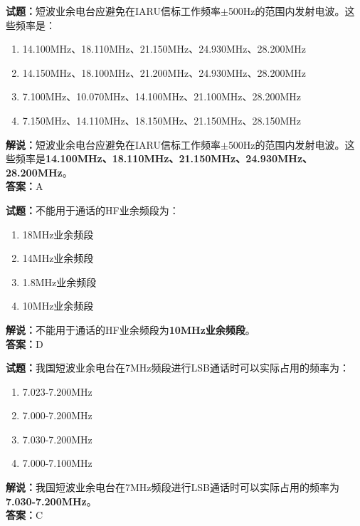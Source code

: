 \documentclass{ctexbook}
\begin{document}
\noindent\textbf{试题：}短波业余电台应避免在IARU信标工作频率$\pm$500Hz的范围内发射电波。这些频率是：%
\begin{enumerate}[leftmargin=3em]
  \item 14.100\unit{\MHz}、18.110\unit{\MHz}、21.150\unit{\MHz}、24.930\unit{\MHz}、28.200\unit{\MHz}
  \item 14.150\unit{\MHz}、18.100\unit{\MHz}、21.200\unit{\MHz}、24.930\unit{\MHz}、28.200\unit{\MHz}
  \item 7.100\unit{\MHz}、10.070\unit{\MHz}、14.100\unit{\MHz}、21.100\unit{\MHz}、28.200\unit{\MHz}
  \item 7.150\unit{\MHz}、14.110\unit{\MHz}、18.150\unit{\MHz}、21.150\unit{\MHz}、28.150\unit{\MHz}
\end{enumerate}
\noindent\textbf{解说：}短波业余电台应避免在IARU信标工作频率$\pm$500Hz的范围内发射电波。这些频率是\textbf{14.100\unit{\MHz}、18.110\unit{\MHz}、21.150\unit{\MHz}、24.930\unit{\MHz}、28.200\unit{\MHz}}。\\\noindent\textbf{答案：}A%

\bigskip

\noindent\textbf{试题：}不能用于通话的HF业余频段为：
\begin{enumerate}[leftmargin=3em]
  \item 18\unit{\MHz}业余频段
  \item 14\unit{\MHz}业余频段
  \item 1.8\unit{\MHz}业余频段
  \item 10\unit{\MHz}业余频段
\end{enumerate}
\noindent\textbf{解说：}不能用于通话的HF业余频段为\textbf{10\unit{\MHz}业余频段}。\\\noindent\textbf{答案：}D

\bigskip

\noindent\textbf{试题：}我国短波业余电台在7\unit{\MHz}频段进行LSB通话时可以实际占用的频率为：
\begin{enumerate}[leftmargin=3em]
  \item 7.023-7.200\unit{\MHz}
  \item 7.000-7.200\unit{\MHz}
  \item 7.030-7.200\unit{\MHz}
  \item 7.000-7.100\unit{\MHz}
\end{enumerate}
\noindent\textbf{解说：}我国短波业余电台在7\unit{\MHz}频段进行LSB通话时可以实际占用的频率为\textbf{7.030-7.200\unit{\MHz}}。\\\noindent\textbf{答案：}C
\end{document}
